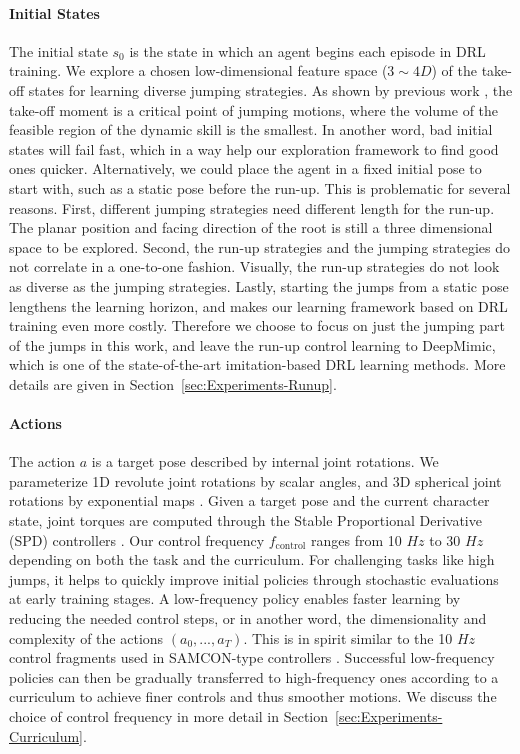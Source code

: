 \paragraph{Initial States}
\label{sec:methods-initial-states}
The initial state $s_0$ is the state in which an agent begins each episode in DRL training. We explore a chosen low-dimensional feature space ($3\sim4D$) of the take-off states for learning diverse jumping strategies. As shown by previous work \cite{ma2021spacetime}, the take-off moment is a critical point of jumping motions, where the volume of the feasible region of the dynamic skill is the smallest. In another word, bad initial states will fail fast, which in a way help our exploration framework to find good ones quicker. Alternatively, we could place the agent in a fixed initial pose to start with, such as a static pose before the run-up. This is problematic for several reasons. First, different jumping strategies need different length for the run-up. The planar position and facing direction of the root is still a three dimensional space to be explored. Second, the run-up strategies and the jumping strategies do not correlate in a one-to-one fashion. Visually, the run-up strategies do not look as diverse as the jumping strategies. Lastly, starting the jumps from a static pose lengthens the learning horizon, and makes our learning framework based on DRL training even more costly. Therefore we choose to focus on just the jumping part of the jumps in this work, and leave the run-up control learning to DeepMimic, which is one of the state-of-the-art imitation-based DRL learning methods. More details are given in Section~\ref{sec:Experiments-Runup}.    

\paragraph{Actions}
The action $a$ is a target pose described by internal joint rotations. We parameterize 1D revolute joint rotations by scalar angles, and 3D spherical joint rotations by exponential maps \cite{Grassia:1998:ExpMap}. Given a target pose and the current character state, joint torques are computed through the Stable Proportional Derivative (SPD) controllers \cite{Tan:2011:SPD}. Our control frequency $f_{\text{control}}$ ranges from 10 $Hz$ to 30 $Hz$ depending on both the task and the curriculum. For challenging tasks like high jumps, it helps to quickly improve initial policies through stochastic evaluations at early training stages. A low-frequency policy enables faster learning by reducing the needed control steps, or in another word, the dimensionality and complexity of the actions $(a_0,...,a_T)$. This is in spirit similar to the 10 $Hz$ control fragments used in SAMCON-type controllers \cite{Liu16}. Successful low-frequency policies can then be gradually transferred to high-frequency ones according to a curriculum to achieve finer controls and thus smoother motions. We discuss the choice of control frequency in more detail in Section~\ref{sec:Experiments-Curriculum}.
